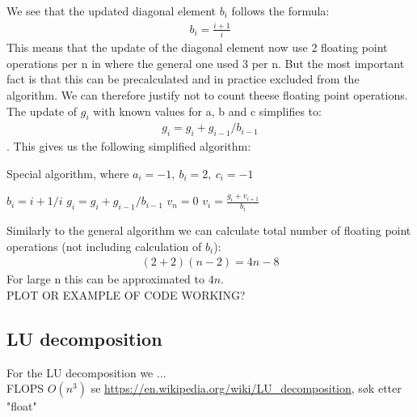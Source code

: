 \documentclass[american,a4paper,12pt]{article}
\begin{document}
We see that the updated diagonal element $b_i$ follows the formula:
\begin{align*}
   b_i = \frac{i+1}{i}
\end{align*}
This means that the update of the diagonal element now use 2 floating point operations per n in where the general one used 3 per n. But the most important fact is that this can be precalculated and in practice excluded from the algorithm. We can therefore justify not to count theese floating point operations. The update of $g_i$ with known values for a, b and c simplifies to:
\begin{align*}
  g_i = g_i + g_{i-1}/{b_{i-1}}
\end{align*}
\cite{linalg}. This gives us the following simplified algorithm:
\begin{algorithm}[H]
\caption{Special algorithm, where $a_i = -1,\ b_i = 2,\ c_i = -1$}
\begin{algorithmic}[1]
   
    \State $b_i = {i+1}/i$ 
    \State $g_i = g_i + g_{i-1}/{b_{i-1}}$ 
  \EndFor
  \Statex
  \State $v_n = 0$ 
    \State $v_i = \frac{g_i + v_{i+1}}{b_i}$
  \EndFor
\end{algorithmic}
\end{algorithm}
Similarly to the general algorithm we can calculate total number of floating point operations (not including calculation of $b_i$):
\begin{align*}
  (2 + 2)(n-2) = 4n - 8
\end{align*}
For large n this can be approximated to $4n$.
\\
PLOT OR EXAMPLE OF CODE WORKING?
\subsection{LU decomposition}
For the LU decomposition we ...\\
FLOPS $O(n^3)$ se \url{https://en.wikipedia.org/wiki/LU_decomposition}, søk etter "float"
\end{document}
